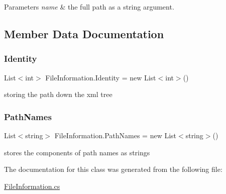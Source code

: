 \begin{DoxyParams}{Parameters}
{\em name} & the full path as a string argument. \\
\hline
\end{DoxyParams}


\subsection{Member Data Documentation}
\mbox{\label{class_file_information_af9646342729b54469438752af5793d3b}} 
\subsubsection{\texorpdfstring{Identity}{Identity}}
{\footnotesize\ttfamily List$<$int$>$ File\+Information.\+Identity = new List$<$int$>$()}



storing the path down the xml tree 

\mbox{\label{class_file_information_ab4b5c2a04bb90cbdb9b9e7fe1320ce88}} 
\subsubsection{\texorpdfstring{PathNames}{PathNames}}
{\footnotesize\ttfamily List$<$string$>$ File\+Information.\+Path\+Names = new List$<$string$>$()}



stores the components of path names as strings 



The documentation for this class was generated from the following file\+:\begin{DoxyCompactItemize}
\item 
\mbox{\hyperlink{_file_information_8cs}{File\+Information.\+cs}}\end{DoxyCompactItemize}

